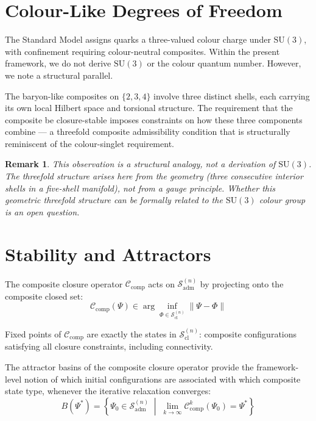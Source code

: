 \documentclass[12pt]{article}
\newtheorem{remark}[theorem]{Remark}
\newcommand{\Ccal}{\mathcal{C}}
\newcommand{\Sadm}{\mathcal{S}_{\mathrm{adm}}}
\newcommand{\Scl}{\mathcal{S}_{\mathrm{cl}}}
\begin{document}
\section{Colour-Like Degrees of Freedom}\label{sec:colour}

The Standard Model assigns quarks a three-valued colour charge under $\mathrm{SU}(3)$, with confinement requiring colour-neutral composites. Within the present framework, we do not derive $\mathrm{SU}(3)$ or the colour quantum number. However, we note a structural parallel.

The baryon-like composites on $\{2,3,4\}$ involve three distinct shells, each carrying its own local Hilbert space and torsional structure. The requirement that the composite be closure-stable imposes constraints on how these three components combine --- a threefold composite admissibility condition that is structurally reminiscent of the colour-singlet requirement.

\begin{remark}
This observation is a structural analogy, not a derivation of $\mathrm{SU}(3)$. The threefold structure arises here from the geometry (three consecutive interior shells in a five-shell manifold), not from a gauge principle. Whether this geometric threefold structure can be formally related to the $\mathrm{SU}(3)$ colour group is an open question.
\end{remark}

\section{Stability and Attractors}\label{sec:attractors}

The composite closure operator $\Ccal_{\mathrm{comp}}$ acts on $\Sadm^{(n)}$ by projecting onto the composite closed set:
\begin{equation}
    \Ccal_{\mathrm{comp}}(\Psi) \in \arg\inf_{\Phi \in \Scl^{(n)}} \|\Psi - \Phi\|
\end{equation}

Fixed points of $\Ccal_{\mathrm{comp}}$ are exactly the states in $\Scl^{(n)}$: composite configurations satisfying all closure constraints, including connectivity.

The attractor basins of the composite closure operator provide the framework-level notion of which initial configurations are associated with which composite state type, whenever the iterative relaxation converges:
\begin{equation}
    B(\Psi^*) = \left\{\Psi_0 \in \Sadm^{(n)} \;\middle|\; \lim_{k \to \infty} \Ccal_{\mathrm{comp}}^k(\Psi_0) = \Psi^*\right\}
\end{equation}
\end{document}
